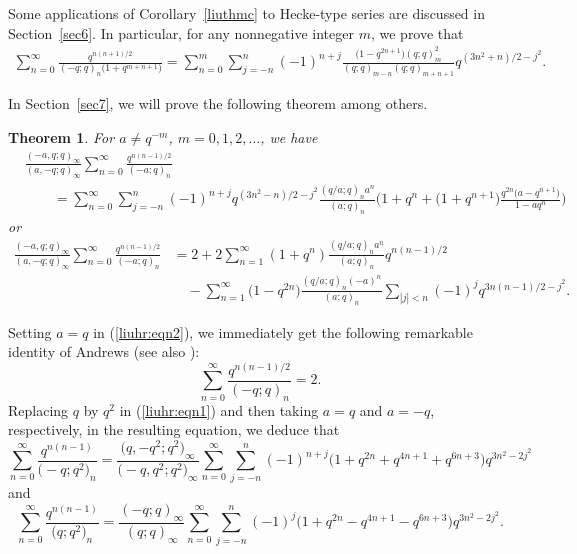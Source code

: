 \documentclass[10pt,a4paper]{amsart}
\numberwithin{equation}{section}
\newtheorem{Theorem}{Theorem}[section]
\begin{document}
Some applications of Corollary~\ref{liuthmc} to Hecke-type series are discussed in Section~\ref{sec6}. In particular, for any nonnegative integer $m$, we prove that
\begin{gather}\label{finitemock}
\sum_{n=0}^\infty \frac{q^{n(n+1)/2}}{(-q; q)_n \bigl(1+q^{m+n+1}\bigr)}
=\sum_{n=0}^m \sum_{j=-n}^n (-1)^{n+j} \frac{\bigl(1-q^{2n+1}\bigr)(q; q)^2_m}
{(q; q)_{m-n} (q; q)_{m+n+1}} q^{(3n^2+n)/2-j^2}.
\end{gather}

In Section~\ref{sec7}, we will prove the following theorem among others.
\begin{Theorem}\label{liuheckethm} For $a\not=q^{-m}$, $m=0, 1, 2, \ldots$, we have
	\begin{align}\label{liuhr:eqn1}
		&\frac{(-a, q; q)_\infty} {(a, -q; q)_\infty}\sum_{n=0}^\infty \frac{q^{n(n-1)/2}}{(-a; q)_n}\\
		&\qquad{}=\sum_{n=0}^\infty \sum_{j=-n}^n (-1)^{n+j} q^{(3n^2-n)/2-j^2} \frac{(q/a; q)_n a^n}{(a; q)_n}
		\biggl(1+q^n+\bigl(1+q^{n+1}\bigr)\frac{q^{2n}\bigl(a-q^{n+1}\bigr)}{1-aq^n}\biggr)\nonumber
	\end{align}		
	or
	\begin{align}
\frac{(-a, q; q)_\infty} {(a, -q; q)_\infty}\sum_{n=0}^\infty \frac{q^{n(n-1)/2}}{(-a; q)_n}
		 &{}=2+2\sum_{n=1}^\infty (1+q^n) \frac{(q/a; q)_n a^n}{(a; q)_n} q^{n(n-1)/2}\nonumber\\
		& \quad{}-\sum_{n=1}^\infty \bigl(1-q^{2n}\bigr)\frac{(q/a; q)_n (-a)^n}{(a; q)_n} \sum_{|j|<n} (-1)^j
		q^{3n(n-1)/2-j^2}.\label{liuhr:eqn2}
	\end{align}
\end{Theorem}	
 Setting $a=q$ in (\ref{liuhr:eqn2}), we immediately get the following remarkable identity of Andrews \mbox{\cite[equation~(4.4)]{Andrews1967}} (see also \cite[equation~(3.62)]{ChenWang2020}):
 \begin{equation*}%
 \sum_{n=0}^\infty \frac{q^{n(n-1)/2}}{(-q; q)_n}=2.
 \end{equation*}
Replacing $q$ by $q^2$ in (\ref{liuhr:eqn1}) and then taking $a=q$ and $a=-q$, respectively, in the resulting equation, we deduce that
\begin{equation*}%
\sum_{n=0}^\infty \frac{q^{n(n-1)}}{\bigl(-q; q^2\bigr)_n}
=\frac{\bigl(q, -q^2; q^2\bigr)_\infty}{\bigl(-q, q^2; q^2\bigr)_\infty}
\sum_{n=0}^\infty \sum_{j=-n}^n (-1)^{n+j} \bigl(1+q^{2n}+q^{4n+1}+q^{6n+3}\bigr)
q^{3n^2-2j^2}
\end{equation*}
and
\begin{equation*}%
	\sum_{n=0}^\infty \frac{q^{n(n-1)}}{\bigl(q; q^2\bigr)_n}
	=\frac{(-q; q)_\infty}{(q; q)_\infty}
	\sum_{n=0}^\infty \sum_{j=-n}^n (-1)^{j} \bigl(1+q^{2n}-q^{4n+1}-q^{6n+3}\bigr)
	q^{3n^2-2j^2}.
\end{equation*}
\end{document}

